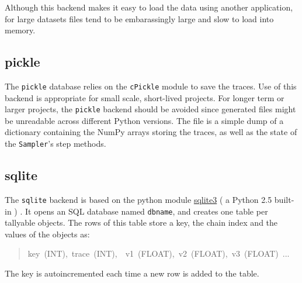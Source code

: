 Although this backend makes it easy to load the data using another application, 
for large datasets files tend to be embarassingly large and slow to load 
into memory.



\hypertarget{pickle}{}
\subsection*{pickle}

The \texttt{pickle} database relies on the \texttt{cPickle} module to save the 
traces. Use of this backend is appropriate for small scale, 
short-lived projects. For longer term or larger projects, the \texttt{pickle} 
backend should be avoided since generated files might be unreadable 
across different Python versions. The  file is a simple dump of a 
dictionary containing the NumPy arrays storing the traces, as well as 
the state of the \texttt{Sampler}'s step methods.



\hypertarget{sqlite}{}
\subsection*{sqlite}

The \texttt{sqlite} backend is based on the python module \href{http://www.sqlite.org}{sqlite3} ( 
a Python 2.5 built-in ) . It opens an SQL database named \texttt{dbname}, 
and creates one table per tallyable objects. The rows of this table
store a key, the chain index and the values of the objects as:
\begin{quote}{\ttfamily \raggedright \noindent
key~(INT),~trace~(INT),~~v1~(FLOAT),~v2~(FLOAT),~v3~(FLOAT)~...~
}\end{quote}

The key is autoincremented each time a new row is added to the table.
\begin{center}\begin{sffamily}
\end{sffamily}
\end{center}


